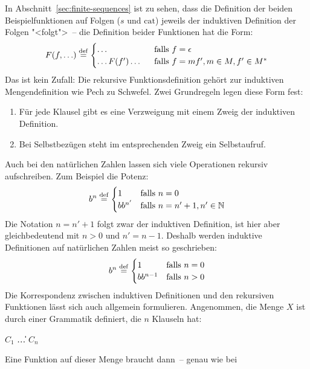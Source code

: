 In Abschnitt~\ref{sec:finite-sequences} ist zu sehen, dass die
Definition der beiden Beispielfunktionen auf Folgen ($s$ und
$\mathrm{cat}$) jeweils der induktiven Definition der Folgen
"<folgt">~-- die Definition beider Funktionen hat die Form:
%
\begin{displaymath}
  F(f, \ldots)
  \stackrel{\rm def}{=}
  \begin{cases}
    \ldots & \textrm{ falls $f = \epsilon$}\\
    \ldots F(f') \ldots \ & \textrm{ falls $f = mf', m\in M, f'\in M^\ast$}
  \end{cases}
\end{displaymath}
%
Das ist kein Zufall: Die rekursive Funktionsdefinition gehört zur
induktiven Mengendefinition wie Pech zu Schwefel.  Zwei Grundregeln
legen diese Form fest:
%
\begin{enumerate}
\item Für jede Klausel gibt es eine Verzweigung mit einem Zweig  der
  induktiven Definition.
\item Bei Selbstbezügen steht im entsprechenden Zweig ein
  Selbstaufruf.
\end{enumerate}
%
Auch bei den natürlichen Zahlen lassen sich viele Operationen rekursiv
aufschreiben.  Zum Beispiel die Potenz:
%
\begin{displaymath}
  b^n \stackrel{\rm def}{=}
  \begin{cases}
    1 & \textrm{falls } n = 0\\
    b b^{n'} & \textrm{falls } n = n' +1, n'\in\mathbb{N}
  \end{cases}
\end{displaymath}
%
Die Notation $n = n' + 1$ folgt zwar der induktiven Definition, ist
hier aber gleichbedeutend mit $n>0$ und $n' = n - 1$.  Deshalb werden
induktive Definitionen auf natürlichen Zahlen meist so geschrieben:
%
\begin{displaymath}
  b^n \stackrel{\rm def}{=}
  \begin{cases}
    1 & \textrm{falls } n = 0\\
    b b^{n-1} & \textrm{falls } n > 0
  \end{cases}
\end{displaymath}
%
Die Korrespondenz zwischen induktiven Definitionen und den rekursiven
Funktionen lässt sich auch allgemein formulieren.  Angenommen, die
Menge $X$ ist durch einer Grammatik definiert, die $n$ Klauseln hat:
%
\begin{grammar}
   \: $C_1$ \| \ldots \| $C_n$
\end{grammar}
%
Eine Funktion auf dieser Menge braucht dann~-- genau wie bei
